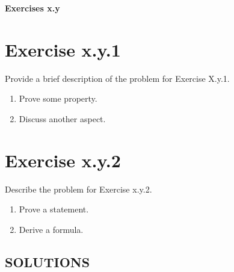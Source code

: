 \documentclass{exam}
\begin{document}
\begin{center}
    \textbf{\Large Exercises x.y }
\end{center}

\section*{Exercise x.y.1}
Provide a brief description of the problem for Exercise X.y.1.
\begin{enumerate}
    \item Prove some property.
    \item Discuss another aspect.
\end{enumerate}

\section*{Exercise x.y.2}
 Describe the problem for Exercise x.y.2.
\begin{enumerate}
    \item Prove a statement.
    \item Derive a formula.
\end{enumerate}


\newpage

\begin{center}    
    \section*{SOLUTIONS}
\end{center}
\end{document}
